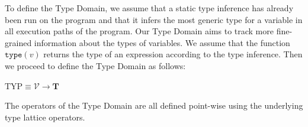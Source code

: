 \documentclass[10pt]{report}
\begin{document}
To define the Type Domain, we assume that a static type inference \cite{mostafa} has already been run on the program and that it infers the most generic type for a variable in all execution paths of the program. Our Type Domain aims to track more fine-grained information about the types of variables. We assume that the function $ \mathtt{type}(v) $ returns the type of an expression according to the type inference. Then we proceed to define the Type Domain as follows:  

\begin{center}
	$ \mathrm{TYP} \equiv \mathcal{V} \longrightarrow \mathbf{T}$
\end{center} 

The operators of the Type Domain are all defined point-wise using the underlying type lattice operators. 
\end{document}
